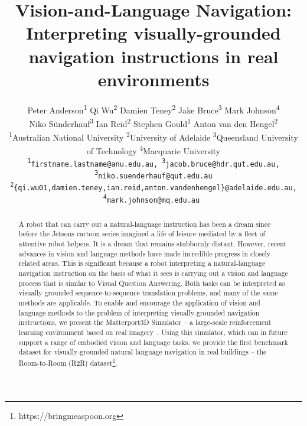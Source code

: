 \documentclass[10pt,twocolumn,letterpaper]{article}
\begin{document}
\title{ Vision-and-Language Navigation: Interpreting visually-grounded\\navigation instructions in real environments }

\author{Peter Anderson\textsuperscript{1} \hspace{20pt} Qi Wu\textsuperscript{2} \hspace{20pt} Damien Teney\textsuperscript{2} \hspace{20pt} Jake Bruce\textsuperscript{3} \hspace{20pt} Mark Johnson\textsuperscript{4}\\ Niko S\"{u}nderhauf\textsuperscript{3} \hspace{20pt} Ian Reid\textsuperscript{2} \hspace{20pt}
	Stephen Gould\textsuperscript{1} \hspace{20pt} Anton van den Hengel\textsuperscript{2}\\
	\normalsize{
		\textsuperscript{1}Australian National University \space \textsuperscript{2}University of Adelaide \space \textsuperscript{3}Queensland University of Technology \space \textsuperscript{4}Macquarie University
	}\\
	\tt\small\textsuperscript{1}firstname.lastname@anu.edu.au, \tt\small\textsuperscript{3}jacob.bruce@hdr.qut.edu.au,
	\tt\small\textsuperscript{3}niko.suenderhauf@qut.edu.au\\
	\tt\small\textsuperscript{2}\{qi.wu01,damien.teney,ian.reid,anton.vandenhengel\}@adelaide.edu.au,
	\tt\small\textsuperscript{4}mark.johnson@mq.edu.au
}

\maketitle


\begin{abstract}
A robot that can carry out a natural-language instruction has been a dream since before the Jetsons cartoon series imagined a life of leisure mediated by a fleet of attentive robot helpers.  It is a dream that remains stubbornly distant. However, recent advances in vision and language methods have made incredible progress in closely related areas. This is significant because a robot interpreting a natural-language navigation instruction on the basis of what it sees is carrying out a vision and language process that is similar to Visual Question Answering.  Both tasks can be interpreted as visually grounded sequence-to-sequence translation problems, and many of the same methods are applicable. To enable and encourage the application of vision and language methods to the problem of interpreting visually-grounded navigation instructions, we present the Matterport3D Simulator -- a large-scale reinforcement learning environment based on real imagery~\cite{Matterport3D}. Using this simulator, which can in future support a range of embodied vision and language tasks, we provide the first benchmark dataset for visually-grounded natural language navigation in real buildings -- the Room-to-Room (R2R) dataset\footnote{https://bringmeaspoon.org}. 	
\end{abstract}
\end{document}

